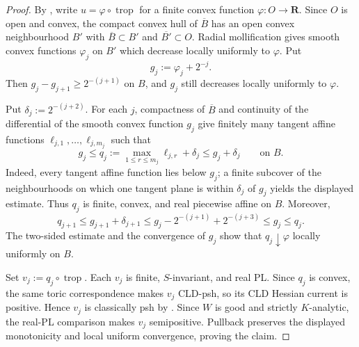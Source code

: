 \begin{proof}
By \cite[Theorem~5.3.11]{BGJKK25}, write
\(u=\varphi\circ\operatorname{trop}\) for a finite convex function
\(\varphi:O\to\mathbf R\).  Since \(O\) is open and convex, the compact
convex hull of \(\overline B\) has an open convex neighbourhood \(B'\)
with \(\overline B\subset B'\) and \(\overline {B'}\subset O\).  Radial
mollification gives smooth convex functions \(\varphi_j\) on \(B'\) which
decrease locally uniformly to \(\varphi\).  Put
\[
                         g_j:=\varphi_j+2^{-j}.
\]
Then \(g_j-g_{j+1}\geq2^{-(j+1)}\) on \(B\), and \(g_j\) still decreases
locally uniformly to \(\varphi\).

Put \(\delta_j:=2^{-(j+2)}\).  For each \(j\), compactness of \(\overline B\)
and continuity of the differential of the smooth convex function \(g_j\)
give finitely many tangent affine functions
\(\ell_{j,1},\ldots,\ell_{j,m_j}\) such that
\[
 g_j\leq q_j:=\max_{1\leq r\leq m_j}\ell_{j,r}+\delta_j
       \leq g_j+\delta_j
 \qquad\text{on }B.
\]
Indeed, every tangent affine function lies below \(g_j\); a finite subcover
of the neighbourhoods on which one tangent plane is within \(\delta_j\) of
\(g_j\) yields the displayed estimate.  Thus \(q_j\) is finite, convex, and
real piecewise affine on \(B\).  Moreover,
\[
 q_{j+1}\leq g_{j+1}+\delta_{j+1}
 \leq g_j-2^{-(j+1)}+2^{-(j+3)}
 \leq g_j\leq q_j.
\]
The two-sided estimate and the convergence of \(g_j\) show that
\(q_j\downarrow\varphi\) locally uniformly on \(B\).

Set \(v_j:=q_j\circ\operatorname{trop}\).  Each \(v_j\) is finite,
\(S\)-invariant, and real PL.  Since \(q_j\) is convex, the same toric
correspondence makes \(v_j\) CLD-psh, so its CLD Hessian current is
positive.  Hence \(v_j\) is classically psh by
.  Since \(W\) is good and strictly
\(K\)-analytic, the real-PL comparison  makes
\(v_j\) semipositive.  Pullback preserves the displayed monotonicity and
local uniform convergence, proving the claim.
\end{proof}
